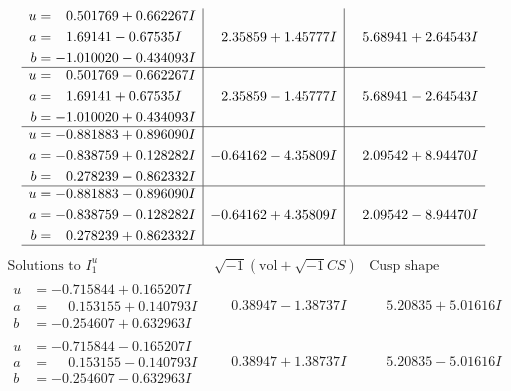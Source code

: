 \documentclass[1p]{elsarticle_modified}
\theoremstyle{definition}
\newcommand{\I}{\sqrt{-1}}
\begin{document}
$$\begin{array}{c|c|c}
\begin{aligned}
u &= \phantom{-}0.501769 + 0.662267 I \\
a &= \phantom{-}1.69141 - 0.67535 I \\
b &= -1.010020 - 0.434093 I\end{aligned}
 & \phantom{-}2.35859 + 1.45777 I & \phantom{-}5.68941 + 2.64543 I \\ \hline\begin{aligned}
u &= \phantom{-}0.501769 - 0.662267 I \\
a &= \phantom{-}1.69141 + 0.67535 I \\
b &= -1.010020 + 0.434093 I\end{aligned}
 & \phantom{-}2.35859 - 1.45777 I & \phantom{-}5.68941 - 2.64543 I \\ \hline\begin{aligned}
u &= -0.881883 + 0.896090 I \\
a &= -0.838759 + 0.128282 I \\
b &= \phantom{-}0.278239 - 0.862332 I\end{aligned}
 & -0.64162 - 4.35809 I & \phantom{-}2.09542 + 8.94470 I \\ \hline\begin{aligned}
u &= -0.881883 - 0.896090 I \\
a &= -0.838759 - 0.128282 I \\
b &= \phantom{-}0.278239 + 0.862332 I\end{aligned}
 & -0.64162 + 4.35809 I & \phantom{-}2.09542 - 8.94470 I\\
 \hline 
 \end{array}$$\newpage$$\begin{array}{c|c|c}  
\text{Solutions to }I^u_{1}& \I (\text{vol} + \sqrt{-1}CS) & \text{Cusp shape}\\
 \hline 
\begin{aligned}
u &= -0.715844 + 0.165207 I \\
a &= \phantom{-}0.153155 + 0.140793 I \\
b &= -0.254607 + 0.632963 I\end{aligned}
 & \phantom{-}0.38947 - 1.38737 I & \phantom{-}5.20835 + 5.01616 I \\ \hline\begin{aligned}
u &= -0.715844 - 0.165207 I \\
a &= \phantom{-}0.153155 - 0.140793 I \\
b &= -0.254607 - 0.632963 I\end{aligned}
 & \phantom{-}0.38947 + 1.38737 I & \phantom{-}5.20835 - 5.01616 I \\ \hline\begin{aligned}

\end{aligned}
\end{array}$$
\end{document}
